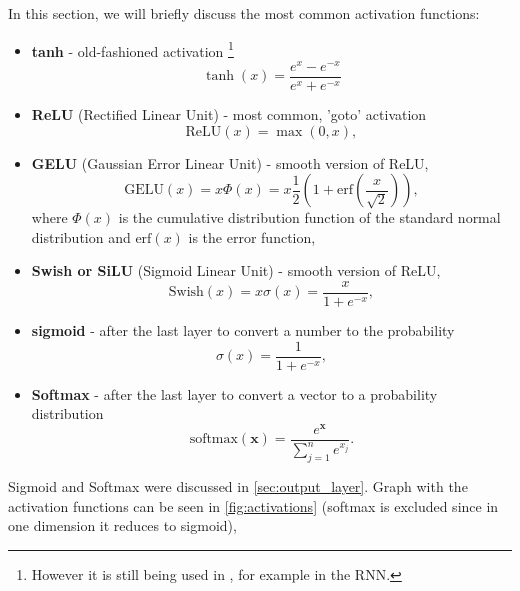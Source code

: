 In this section, we will briefly discuss the most common activation functions:
\begin{itemize}
    \item \textbf{tanh} - old-fashioned \ml activation \footnote{However it is still being used in \dl, for example in the RNN\cite{rnn}.} 
    \begin{equation}
        \tanh(x) = \frac{e^x - e^{-x}}{e^x + e^{-x}}
    \end{equation}
    \item \textbf{ReLU} (Rectified Linear Unit) - most common, 'goto' \dl activation 
    \begin{equation}
        \text{ReLU}(x) = \max(0,x),
    \end{equation}
    \item \textbf{GELU} (Gaussian Error Linear Unit) \cite{gelu} - smooth version of ReLU,  
    \begin{equation}
        \text{GELU}(x) = x\Phi(x) = x\frac{1}{2}\left(1 + \text{erf}\left(\frac{x}{\sqrt{2}}\right)\right),
    \end{equation}
    where $\Phi(x)$ is the cumulative distribution function of the standard normal distribution and $\text{erf}(x)$ is the error function,
    \item \textbf{Swish or SiLU} (Sigmoid Linear Unit) \cite{swish} - smooth version of ReLU, 
    \begin{equation}
        \text{Swish}(x) = x\sigma(x) = \frac{x}{1 + e^{-x}},
    \end{equation}
    \item \textbf{sigmoid} - after the last layer to convert a number to the probability 
    \begin{equation}
        \sigma(x) = \frac{1}{1 + e^{-x}},
    \end{equation}
    \item \textbf{Softmax} - after the last layer to convert a vector to a probability distribution 
    \begin{equation}
        \text{softmax}(\pmb{x}) = \frac{e^{\pmb{x}}}{\sum_{j=1}^n e^{x_j}}.
    \end{equation}
\end{itemize}
Sigmoid and Softmax were discussed in \cref{sec:output_layer}.
Graph with the activation functions can be seen in \cref{fig:activations} (softmax is excluded since in one dimension it reduces to sigmoid),
